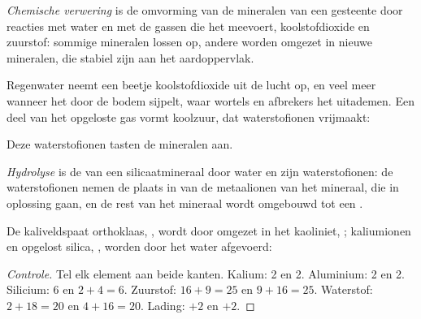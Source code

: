 \begin{definition}\label{def:g10:soil-formation:chemical-weathering}
\emph{Chemische verwering} is de omvorming van de
mineralen van een gesteente door reacties met water en met de gassen die het
meevoert, koolstofdioxide en zuurstof: sommige mineralen lossen op, andere worden
omgezet in nieuwe mineralen, die stabiel zijn aan het aardoppervlak.
\end{definition}

Regenwater neemt een beetje koolstofdioxide uit de lucht op, en veel meer
wanneer het door de bodem sijpelt, waar wortels en afbrekers het uitademen. Een
deel van het opgeloste gas vormt koolzuur, dat waterstofionen vrijmaakt:
\begin{center}
\end{center}
Deze waterstofionen tasten de mineralen aan.

\begin{definition}[Hydrolyse]\label{def:g10:soil-formation:hydrolysis}
\emph{Hydrolyse} is de  van een
silicaatmineraal door water en zijn waterstofionen: de waterstofionen nemen de
plaats in van de metaalionen van het mineraal, die in oplossing gaan, en de rest
van het mineraal wordt omgebouwd tot een .
\end{definition}

\begin{proposition}\label{prop:g10:soil-formation:hydrolysis}
De kaliveldspaat orthoklaas, , wordt door  omgezet in het
 kaoliniet, ; kaliumionen en opgelost silica,
, worden door het water afgevoerd:
\begin{center}
\end{center}
\end{proposition}

\begin{proof}[Controle]
Tel elk element aan beide kanten. Kalium: 2 en 2. Aluminium: 2 en 2.
Silicium: 6 en $2 + 4 = 6$. Zuurstof: $16 + 9 = 25$ en $9 + 16 = 25$.
Waterstof: $2 + 18 = 20$ en $4 + 16 = 20$. Lading: $+2$ en $+2$.
\end{proof}

